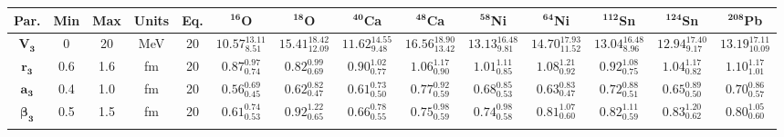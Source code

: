\bgroup
\def\arraystretch{1.5}%
\begin{tabular}{ c c c c c c c c c c c c c c} 
\textbf{Par.} & \textbf{Min} & \textbf{Max} &                \textbf{Units} & \textbf{Eq.}& \textbf{$\mathbf{^{16}}$O}& \textbf{$\mathbf{^{18}}$O}& \textbf{$\mathbf{^{40}}$Ca}& \textbf{$\mathbf{^{48}}$Ca}& \textbf{$\mathbf{^{58}}$Ni}& \textbf{$\mathbf{^{64}}$Ni}& \textbf{$\mathbf{^{112}}$Sn}& \textbf{$\mathbf{^{124}}$Sn}& \textbf{$\mathbf{^{208}}$Pb}\\
 \hline 
$\mathbf{V_{3}}$ & 0 & 20 & MeV & 20 & $10.57^{13.11}_{8.51}$ & $15.41^{18.42}_{12.09}$ & $11.62^{14.55}_{9.48}$ & $16.56^{18.90}_{13.42}$ & $13.13^{16.48}_{9.81}$ & $14.70^{17.93}_{11.52}$ & $13.04^{16.48}_{8.96}$ & $12.94^{17.40}_{9.17}$ & $13.19^{17.11}_{10.09}$\\ 
$\mathbf{r_{3}}$ & 0.6 & 1.6 & fm & 20 & $0.87^{0.97}_{0.74}$ & $0.82^{0.99}_{0.69}$ & $0.90^{1.02}_{0.77}$ & $1.06^{1.17}_{0.90}$ & $1.01^{1.11}_{0.85}$ & $1.08^{1.21}_{0.92}$ & $0.92^{1.08}_{0.75}$ & $1.04^{1.17}_{0.82}$ & $1.10^{1.17}_{1.01}$\\ 
$\mathbf{a_{3}}$ & 0.4 & 1.0 & fm & 20 & $0.56^{0.69}_{0.45}$ & $0.62^{0.82}_{0.47}$ & $0.61^{0.73}_{0.50}$ & $0.77^{0.92}_{0.59}$ & $0.68^{0.85}_{0.53}$ & $0.63^{0.83}_{0.47}$ & $0.72^{0.88}_{0.51}$ & $0.65^{0.89}_{0.50}$ & $0.70^{0.86}_{0.57}$\\ 
$\mathbf{\beta_{3}}$ & 0.5 & 1.5 & fm & 20 & $0.61^{0.74}_{0.53}$ & $0.92^{1.22}_{0.65}$ & $0.66^{0.78}_{0.55}$ & $0.75^{0.98}_{0.59}$ & $0.74^{0.98}_{0.58}$ & $0.81^{1.07}_{0.60}$ & $0.82^{1.11}_{0.59}$ & $0.83^{1.20}_{0.62}$ & $0.80^{1.05}_{0.60}$\\ 
\\ 
\end{tabular}
\egroup
